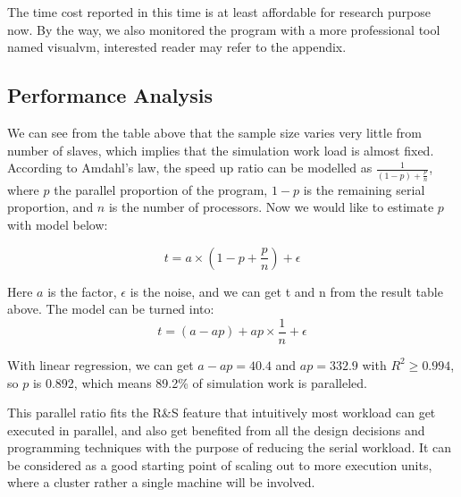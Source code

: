 The time cost reported in this time is at least affordable for research purpose now. By the way, we also monitored the program with a more professional tool named visualvm, interested reader may refer to the appendix.

\subsection{Performance Analysis}

We can see from the table above that the sample size varies very little from number of slaves, which implies that the simulation work load is almost fixed. According to Amdahl's law, the speed up ratio can be modelled as $\frac{1}{(1 - p) + \frac{p}{n}}$, where $p$ the parallel proportion of the program, $1 - p$ is the remaining serial proportion, and $n$ is the number of processors. Now we would like to estimate $p$ with model below:

$$ t = a \times (1 - p + \frac{p}{n}) + \epsilon $$

Here $a$ is the factor, $\epsilon$ is the noise, and we can get t and n from the result table above. The model can be turned into: 
$$ t = (a - ap) + ap \times \frac{1}{n} + \epsilon $$

With linear regression, we can get $a - ap = 40.4$ and $ap = 332.9$ with $R^2 \geqslant 0.994$, so $p$ is 0.892, which means 89.2\% of simulation work is paralleled.

This parallel ratio fits the R\&S feature that intuitively most workload can get executed in parallel, and also get benefited from all the design decisions and programming techniques with the purpose of reducing the serial workload. It can be considered as a good starting point of scaling out to more execution units, where a cluster rather a single machine will be involved.
